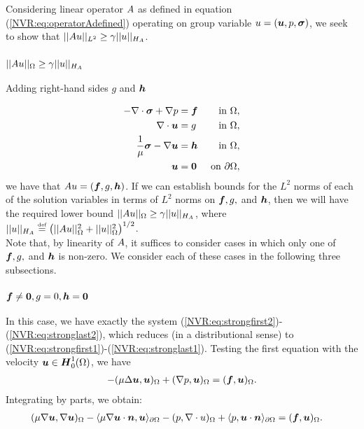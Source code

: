 Considering linear operator $\A$ as defined in equation (\ref{NVR:eq:operatorAdefined}) operating on group variable $u = (\vect{u},p,\NVRtensor{\sigma})$, we seek to show that $||\A u||_{L^{2}} \geq \gamma ||u||_{\HA}$.\\

\subsubsection{$||\A u||_{\Omega} \geq \gamma ||u||_{\HA}$}
Adding right-hand sides $g$ and $\NVRtensor{h}$

\begin{align}
-\NVRdiv \NVRtensor{\sigma} + \NVRgrad p &= \vect{f} & \text{ in } \Omega, \label{NVR:eq:strongfirst3} \\
\NVRdiv \vect{u} &= g & \text{ in } \Omega, \\
\frac{1}{\mu}\NVRtensor{\sigma} - \NVRgrad \vect{u} &= \NVRtensor{h} & \text{ in } \Omega, \label{NVR:eq:strongsecondtolast3} \\
\vect{u} &= \vect{0} & \text{ on } \partial\Omega,\label{NVR:eq:stronglast3}
\end{align}
we have that $\A u = (\vect{f},g,\NVRtensor{h})$.  If we can establish bounds for the $L^{2}$ norms of each of the solution variables in terms of $L^{2}$ norms on $\vect{f},g,$ and $\NVRtensor{h}$, then we will have the required lower bound $|| \A u ||_{\Omega} \geq \gamma || u ||_{\HA}$, where $|| u ||_{\HA} \NVReqdef \left( || \A u ||_{\Omega}^{2} + || u ||_{\Omega}^{2}  \right)^{1/2}$.\\

Note that, by linearity of $\A$, it suffices to consider cases in which only one of $\vect{f},g,$ and $\NVRtensor{h}$ is non-zero.  We consider each of these cases in the following three subsections.\\

\subsubsection{$\vect{f} \neq \vect{0},g=0,\NVRtensor{h}=\NVRtensor{0}$}
In this case, we have exactly the system (\ref{NVR:eq:strongfirst2})-(\ref{NVR:eq:stronglast2}), which reduces (in a distributional sense) to (\ref{NVR:eq:strongfirst1})-(\ref{NVR:eq:stronglast1}).  Testing the first equation with the velocity $\vect{u} \in \vect{H}^{1}_{0}(\Omega)$, we have
\begin{align*}
- (\mu \Delta \vect{u}, \vect{u})_{\Omega} + (\NVRgrad p, \vect{u})_{\Omega} &= (\vect{f},\vect{u})_{\Omega}.\\
\end{align*}
Integrating by parts, we obtain:
\begin{align*}
(\mu \NVRgrad \vect{u}, \NVRgrad \vect{u})_{\Omega} - \langle \mu \NVRgrad \vect{u} \cdot \vect{n}, \vect{u} \rangle_{\partial \Omega} - (p, \NVRdiv u)_{\Omega} + \langle p, \vect{u} \cdot \vect{n} \rangle_{\partial \Omega} &= (\vect{f},\vect{u})_{\Omega}.
\end{align*}

